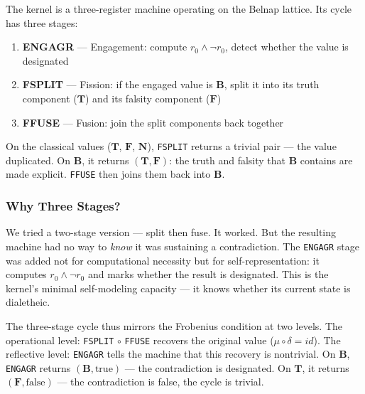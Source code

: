 \documentclass[10pt,a4paper]{article}
\begin{document}
The kernel is a three-register machine operating on the Belnap lattice. Its cycle has three stages:

\begin{enumerate}
    \item \textbf{ENGAGR} --- Engagement: compute $r_0 \land \neg r_0$, detect whether the value is designated
    \item \textbf{FSPLIT} --- Fission: if the engaged value is $\mathbf{B}$, split it into its truth component ($\mathbf{T}$) and its falsity component ($\mathbf{F}$)
    \item \textbf{FFUSE} --- Fusion: join the split components back together
\end{enumerate}

On the classical values ($\mathbf{T}$, $\mathbf{F}$, $\mathbf{N}$), \texttt{FSPLIT}  returns a trivial pair --- the value duplicated. On $\mathbf{B}$, it returns $(\mathbf{T}, \mathbf{F})$: the truth and falsity that $\mathbf{B}$ contains are made explicit. \texttt{FFUSE} then joins them back into $\mathbf{B}$.

\subsubsection{Why Three Stages?}

We tried a two-stage version --- split then fuse. It worked. But the resulting machine had no way to \emph{know} it was sustaining a contradiction. The \texttt{ENGAGR} stage was added not for computational necessity but for self-representation: it computes $r_0 \land \neg r_0$ and marks whether the result is designated. This is the kernel's minimal self-modeling capacity --- it knows whether its current state is dialetheic.

The three-stage cycle thus mirrors the Frobenius condition at two levels. The operational level: \texttt{FSPLIT}  $\circ$ \texttt{FFUSE} recovers the original value ($\mu\circ\delta = id$). The reflective level: \texttt{ENGAGR} tells the machine that this recovery is nontrivial. On $\mathbf{B}$, \texttt{ENGAGR} returns $(\mathbf{B}, \text{true})$ --- the contradiction is designated. On $\mathbf{T}$, it returns $(\mathbf{F}, \text{false})$ --- the contradiction is false, the cycle is trivial.
\end{document}

